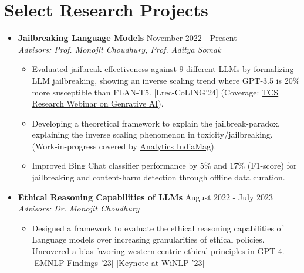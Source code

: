 \documentclass[11pt,letterpaper]{article}
\begin{document}
    \section*{Select Research Projects}
    \begin{itemize}[leftmargin=*,label={},itemsep=6pt]
        \item \textbf{Jailbreaking Language Models} \hfill November 2022 - Present\\
            \textit{Advisors: Prof. Monojit Choudhury, Prof. Aditya Somak}
            \begin{itemize}[leftmargin=*,itemsep=1pt]
            \item Evaluated jailbreak effectiveness against 9 different LLMs by formalizing LLM jailbreaking, showing an
                inverse scaling trend where GPT-3.5 is 20\% more susceptible than FLAN-T5. [Lrec-CoLING'24] (Coverage: \href{https://www.linkedin.com/events/7086646211360821248/comments/}{TCS Research Webinar on
                    Genrative AI}).
                    \item Developing a theoretical framework to explain the jailbreak-paradox, explaining the inverse scaling
                phenomenon in toxicity/jailbreaking. (Work-in-progress covered by \href{https://analyticsindiamag.com/ai-trends/now-jailbreakers-are-taking-over-indian-llms/}{Analytics IndiaMag}).
                    \item Improved Bing Chat classifier performance by 5\% and 17\% (F1-score) for jailbreaking and content-harm
                detection through offline data curation.
            
        \end{itemize}
            \item \textbf{Ethical Reasoning Capabilities of LLMs} \hfill August 2022 - July 2023\\
            \textit{Advisors: Dr. Monojit Choudhury}
            \begin{itemize}[leftmargin=*,itemsep=1pt]
            \item Designed a framework to evaluate the ethical reasoning capabilities of Language models over increasing
                granularities of ethical policies. Uncovered a bias favoring western centric ethical principles in
                GPT-4. [EMNLP Findings '23] [\href{https://2023.winlp.org/schedule/}{Keynote at WiNLP
                    '23}]
            

\end{itemize}
\end{itemize}
\end{document}
